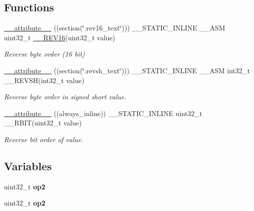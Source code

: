 \subsection*{Functions}
\begin{DoxyCompactItemize}
\item 
\hyperlink{group___c_m_s_i_s___core___instruction_interface_gae84a2733711339c5eefeb0d899506b96}{\-\_\-\-\_\-attribute\-\_\-\-\_\-} ((section(\char`\"{}.rev16\-\_\-text\char`\"{}))) \-\_\-\-\_\-\-S\-T\-A\-T\-I\-C\-\_\-\-I\-N\-L\-I\-N\-E \-\_\-\-\_\-\-A\-S\-M uint32\-\_\-t \hyperlink{group___c_m_s_i_s___core___instruction_interface_ga4e3acd41e7667cdf65ffcd8c76a8613f}{\-\_\-\-\_\-\-R\-E\-V16}(uint32\-\_\-t value)
\begin{DoxyCompactList}\small\item\em Reverse byte order (16 bit) \end{DoxyCompactList}\item 
\hyperlink{group___c_m_s_i_s___core___instruction_interface_ga8e7a866927d3257a82b884ad14dbef4c}{\-\_\-\-\_\-attribute\-\_\-\-\_\-} ((section(\char`\"{}.revsh\-\_\-text\char`\"{}))) \-\_\-\-\_\-\-S\-T\-A\-T\-I\-C\-\_\-\-I\-N\-L\-I\-N\-E \-\_\-\-\_\-\-A\-S\-M int32\-\_\-t \-\_\-\-\_\-\-R\-E\-V\-S\-H(int32\-\_\-t value)
\begin{DoxyCompactList}\small\item\em Reverse byte order in signed short value. \end{DoxyCompactList}\item 
\hyperlink{group___c_m_s_i_s___core___instruction_interface_gab926fe7178a379c3a7c0410b06fcb661}{\-\_\-\-\_\-attribute\-\_\-\-\_\-} ((always\-\_\-inline)) \-\_\-\-\_\-\-S\-T\-A\-T\-I\-C\-\_\-\-I\-N\-L\-I\-N\-E uint32\-\_\-t \-\_\-\-\_\-\-R\-B\-I\-T(uint32\-\_\-t value)
\begin{DoxyCompactList}\small\item\em Reverse bit order of value. \end{DoxyCompactList}\end{DoxyCompactItemize}
\subsection*{Variables}
\begin{DoxyCompactItemize}
\item 
uint32\-\_\-t {\bfseries op2}
\item 
uint32\-\_\-t {\bfseries op2}
\end{DoxyCompactItemize}


